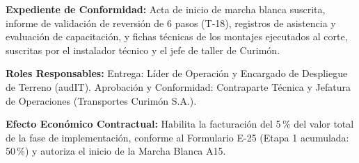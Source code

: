 \par\noindent\textbf{Expediente de Conformidad:} Acta de inicio de marcha blanca suscrita, informe de validación de reversión de 6 pasos (T-18), registros de asistencia y evaluación de capacitación, y fichas técnicas de los montajes ejecutados al corte, suscritas por el instalador técnico y el jefe de taller de Curimón.\par
\par\noindent\textbf{Roles Responsables:} Entrega: Líder de Operación y Encargado de Despliegue de Terreno (audIT). Aprobación y Conformidad: Contraparte Técnica y Jefatura de Operaciones (Transportes Curimón S.A.).\par
\par\noindent\textbf{Efecto Económico Contractual:} Habilita la facturación del 5\,\% del valor total de la fase de implementación, conforme al Formulario E-25 (Etapa 1 acumulada: 50\,\%) y autoriza el inicio de la Marcha Blanca A15.\par

